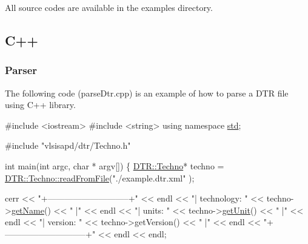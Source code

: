 All source codes are available in the {\ttfamily examples} directory.\hypertarget{dtr_dtrC}{}\subsection{C++}\label{dtr_dtrC}
\hypertarget{dtr_dtrParseC}{}\subsubsection{Parser}\label{dtr_dtrParseC}
The following code ({\ttfamily parse\+Dtr.\+cpp}) is an example of how to parse a D\+TR file using C++ library. 
\begin{DoxyCodeInclude}
\textcolor{preprocessor}{#include <iostream>}
\textcolor{preprocessor}{#include <string>}
\textcolor{keyword}{using namespace }\hyperlink{namespacestd}{std};

\textcolor{preprocessor}{#include "vlsisapd/dtr/Techno.h"}

\textcolor{keywordtype}{int} main(\textcolor{keywordtype}{int} argc, \textcolor{keywordtype}{char} * argv[]) \{
    \hyperlink{class_d_t_r_1_1_techno}{DTR::Techno}* techno = \hyperlink{class_d_t_r_1_1_techno_acf863c2bdb7f1aacc4422c8155c60d17}{DTR::Techno::readFromFile}(\textcolor{stringliteral}{"./example.dtr.xml"}
      );

    cerr << \textcolor{stringliteral}{"+-----------------------------+"} << endl
         << \textcolor{stringliteral}{"| technology:      "} << techno->\hyperlink{class_d_t_r_1_1_techno_a3fd7335faa33dce2f87c7e50eef3e294}{getName}()    <<   \textcolor{stringliteral}{"    |"}   << endl
         << \textcolor{stringliteral}{"| units:           "} << techno->\hyperlink{class_d_t_r_1_1_techno_a42e12e8f890c03ebf12e754d7e489dcb}{getUnit}()    << \textcolor{stringliteral}{"      |"} << endl
         << \textcolor{stringliteral}{"| version:         "} << techno->getVersion() << \textcolor{stringliteral}{"      |"} << endl
         << \textcolor{stringliteral}{"+-----------------------------+"} << endl << endl;


\end{DoxyCodeInclude}
